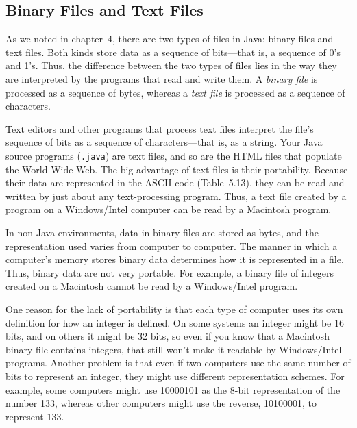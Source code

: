 \subsection{Binary Files and Text Files}
\noindent As we noted in chapter~4, there are two types of files in
 Java: binary files and text
files.  Both kinds store data as a sequence of bits---that is, a
sequence of 0's and 1's.  Thus, the difference between the two types of
files lies in the way they are interpreted by the programs that read
and write them.   A {\em binary file} is processed 
as a sequence of bytes, whereas a {\em text file} is 
processed as a sequence of characters.



Text editors and other programs that process text files interpret the
file's sequence of bits as a sequence of characters---that is, as a
string.   Your Java source programs ({\tt *.java}) are text
files, and so are the HTML files that populate the World Wide Web.
The big advantage of text files is their portability.  Because their data
are represented in the ASCII code \mbox{(Table~5.13),} they can
be read and written by just about any text-processing program.  Thus, a
text file created by a program on a Windows/Intel computer can be read
by a Macintosh program.

In non-Java environments, data in binary files are stored as bytes,
and the representation used varies from computer to computer.  The
manner in which a computer's memory stores binary data determines how
it is represented in a file. Thus, binary data are not very portable.
For example, a binary file of integers created on a Macintosh cannot
be read by a Windows/Intel program.

One reason for the lack of portability is that each type of computer
uses its own definition for how an integer is defined.  On some systems
 an integer might be
16 bits, and on others it might be 32 bits, so even if you know that a
Macintosh binary file contains integers, that still won't make it
readable by Windows/Intel programs.  Another problem is that even if
two computers use the same number of bits to represent an integer,
they might use different representation schemes.  For example, some
computers might use 10000101 as the 8-bit representation of the number
133, whereas other computers might use the reverse, 10100001, to
represent 133.

